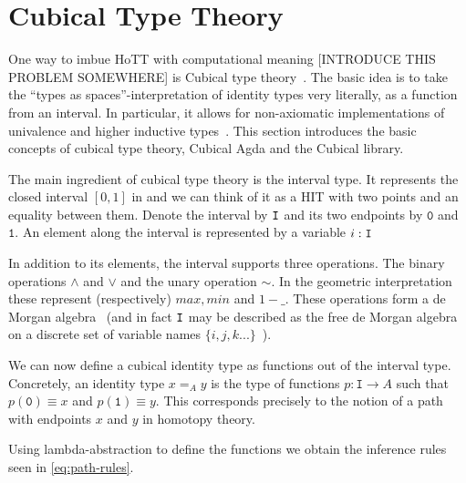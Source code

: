 \section{Cubical Type Theory}\label{sec:cubical}

One way to imbue HoTT with computational meaning [INTRODUCE THIS PROBLEM
SOMEWHERE] is Cubical type theory~\cite{cohen2016cubical}. The basic idea is to
take the ``types as spaces''-interpretation of identity types very literally, as
a function from an interval. In particular, it allows for non-axiomatic
implementations of univalence and higher inductive types~\cite{coquand2018higher}. This section
introduces the basic concepts of cubical type theory, Cubical Agda and the
Cubical library.

The main ingredient of cubical type theory is the interval type. It represents
the closed interval $[0,1]$ in and we can think of it as a HIT with two points
and an equality between them. Denote the interval by $\texttt{I}$ and its two
endpoints by $\texttt{0}$ and $\texttt{1}$. An element along the interval is
represented by a variable $i : \texttt{I}$

In addition to its elements, the interval supports three operations. The binary
operations $\land$ and $\lor$ and the unary operation $\sim$. In the geometric
interpretation these represent (respectively) $max, min$ and $1 - \_$. These
operations form a de Morgan algebra~\cite{mortberg2020cubical} (and in fact
$\texttt{I}$ may be described as the free de Morgan algebra on a discrete set of
variable names $\{i, j, k ...\}$~\cite{cohen2016cubical}).

We can now define a cubical identity type as functions out of the interval type.
Concretely, an identity type $x =_A y$ is the type of functions $p : \texttt{I}
\rightarrow A$ such that $p(\texttt{0}) \equiv x$ and $p(\texttt{1}) \equiv y$.
This corresponds precisely to the notion of a path with endpoints $x$ and $y$ in
homotopy theory.

Using lambda-abstraction to define the functions we obtain the inference rules
seen in \autoref{eq:path-rules}.

